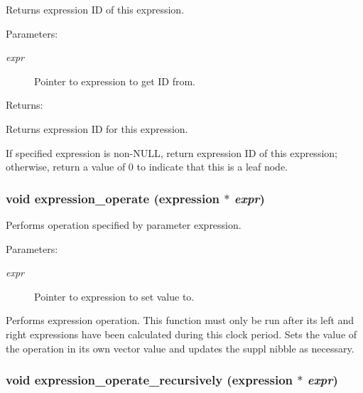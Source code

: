 Returns expression ID of this expression.

\begin{Desc}
\item[Parameters: ]\par
\begin{description}
\item[{\em 
expr}]Pointer to expression to get ID from. \end{description}
\end{Desc}
\begin{Desc}
\item[Returns: ]\par
Returns expression ID for this expression.\end{Desc}
If specified expression is non-NULL, return expression ID of this expression; otherwise, return a value of 0 to indicate that this is a leaf node. 
\subsubsection{\setlength{\rightskip}{0pt plus 5cm}void expression\_\-operate ({\bf expression} $\ast$ {\em expr})}\label{expr_8c_a17}


Performs operation specified by parameter expression.

\begin{Desc}
\item[Parameters: ]\par
\begin{description}
\item[{\em 
expr}]Pointer to expression to set value to.\end{description}
\end{Desc}
Performs expression operation. This function must only be run after its left and right expressions have been calculated during this clock period. Sets the value of the operation in its own vector value and updates the suppl nibble as necessary. 
\subsubsection{\setlength{\rightskip}{0pt plus 5cm}void expression\_\-operate\_\-recursively ({\bf expression} $\ast$ {\em expr})}\label{expr_8c_a18}


